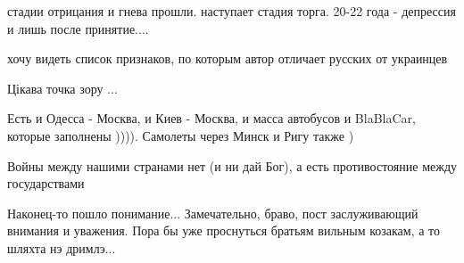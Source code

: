 \begin{itemize}
стадии отрицания и гнева прошли. наступает стадия торга. 20-22 года - депрессия и лишь после принятие....

хочу видеть список признаков, по которым автор отличает русских от украинцев

Цікава точка зору ...

Есть и Одесса - Москва, и Киев - Москва, и масса автобусов и BlaBlaCar, которые заполнены )))). Самолеты через Минск и Ригу также )

Войны между нашими странами нет (и ни дай Бог), а есть противостояние между государствами


Наконец-то пошло понимание... Замечательно, браво, пост заслуживающий внимания
и уважения. Пора бы уже проснуться братьям вильным козакам, а то шляхта нэ
дримлэ...

\end{itemize} %
